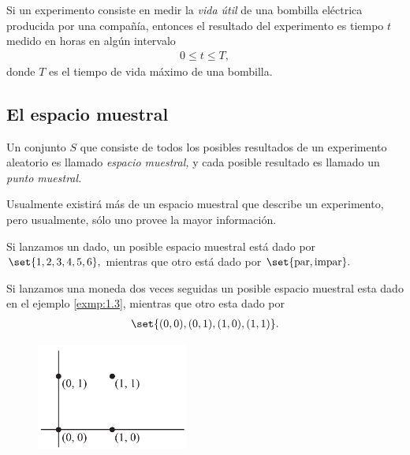  \begin{ejemplo}
  \label{exmp:1.5}
  Si un experimento consiste en medir la \emph{vida útil} de una bombilla eléctrica producida por una compa\~nía, entonces el resultado del experimento es tiempo $t$ medido en horas en algún intervalo
  \begin{align*}
   0\leq t \leq T,
  \end{align*}
donde $T$ es el tiempo de vida máximo de una bombilla.
 \end{ejemplo}



\subsection{El espacio muestral}
{}
Un conjunto $S$ que consiste de todos los posibles resultados de un experimento aleatorio es llamado \emph{espacio muestral,}  y cada posible resultado es llamado un \emph{punto muestral.}

Usualmente existirá más de un espacio muestral que describe un experimento, pero usualmente, sólo uno provee la mayor información.

{}
\begin{ejemplo}
 \label{exmp:1.6}
 Si lanzamos un dado, un posible espacio muestral está dado por $\set{1,2,3,4,5,6},$  mientras que otro está dado por $\set{\text{par},\text{impar}}.$
\end{ejemplo}


{}
\begin{ejemplo}
 \label{exmp:1.7}
 Si lanzamos una moneda dos veces seguidas un posible espacio muestral esta dado en el ejemplo \ref{exmp:1.3},  mientras que otro esta dado por
 \begin{align*}
\set{(0,0), (0,1), (1,0),(1,1)}.
\end{align*}
\end{ejemplo}



\begin{figure}
 \centering
 \includegraphics[width=5cm,keepaspectratio=true]{./pe/pands0101.png}
 \label{fig:0101}
\end{figure}


